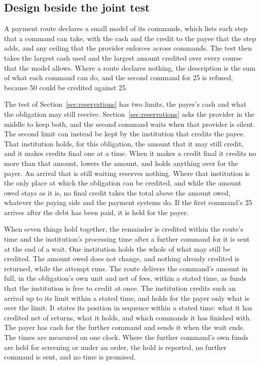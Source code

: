\documentclass{momentum}
\begin{document}
\subsection{Design beside the joint test}
\label{sec:conditions-design}

A payment route declares a small model of its commands, which lists each step that a command can take, with the cash and the credit to the payee that the step adds, and any ceiling that the provider enforces across commands. The test then takes the largest cash used and the largest amount credited over every course that the model allows. Where a route declares nothing, the description is the sum of what each command can do, and the second command for 25 is refused, because 50 could be credited against 25.

The test of Section~\ref{sec:reservations} has two limits, the payer's cash and what the obligation may still receive. Section~\ref{sec:reservations} asks the provider in the middle to keep both, and the second command waits when that provider is silent. The second limit can instead be kept by the institution that credits the payee. That institution holds, for this obligation, the amount that it may still credit, and it makes credits final one at a time. When it makes a credit final it credits no more than that amount, lowers the amount, and holds anything over for the payer. An arrival that is still waiting reserves nothing. Where that institution is the only place at which the obligation can be credited, and while the amount owed stays as it is, no final credit takes the total above the amount owed, whatever the paying side and the payment systems do. If the first command's 25 arrives after the debt has been paid, it is held for the payer.

When seven things hold together, the remainder is credited within the route's time and the institution's processing time after a further command for it is sent at the end of a wait. One institution holds the whole of what may still be credited. The amount owed does not change, and nothing already credited is returned, while the attempt runs. The route delivers the command's amount in full, in the obligation's own unit and net of fees, within a stated time, as funds that the institution is free to credit at once. The institution credits such an arrival up to its limit within a stated time, and holds for the payer only what is over the limit. It states its position in sequence within a stated time: what it has credited net of returns, what it holds, and which commands it has finished with. The payer has cash for the further command and sends it when the wait ends. The times are measured on one clock. Where the further command's own funds are held for screening or under an order, the hold is reported, no further command is sent, and no time is promised.
\end{document}
